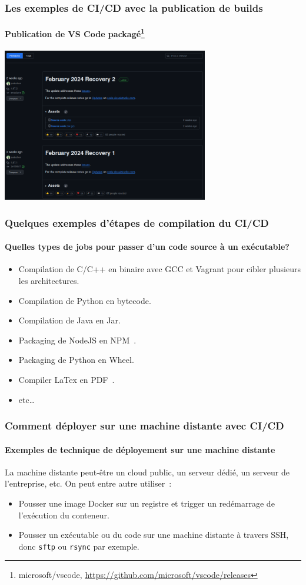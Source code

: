 \documentclass{beamer}
\begin{document}
    \begin{frame}
        \frametitle{Les exemples de CI/CD avec la publication de builds}
        \framesubtitle{Publication de VS Code packagé\footnote{microsoft/vscode, \url{https://github.com/microsoft/vscode/releases}}}
        \transdissolve
        \centering
        \includegraphics[width=9cm]{image/vs-code-release.png}
    \end{frame}

    \begin{frame}
        \frametitle{Quelques exemples d'étapes de compilation du CI/CD}
        \framesubtitle{Quelles types de jobs pour passer d'un code source à un exécutable?}
        \transdissolve
        \pause
        \begin{itemize}
            \item Compilation de C/C++ en binaire avec GCC et Vagrant pour cibler plusieurs les architectures.
            \item Compilation de Python en bytecode.
            \item Compilation de Java en Jar.
            \item Packaging de NodeJS en NPM~.
            \item Packaging de Python en Wheel.
            \item Compiler LaTex en PDF~.
            \item etc\ldots
        \end{itemize}
    \end{frame}

    \begin{frame}
        \frametitle{Comment déployer sur une machine distante avec CI/CD}
        \framesubtitle{Exemples de technique de déployement sur une machine distante}
        \transdissolve
        La machine distante peut-être un cloud public, un serveur dédié, un serveur de l'entreprise, etc.
        \bigbreak
        On peut entre autre utiliser~:
        \begin{itemize}
            \item Pousser une image Docker sur un registre et trigger un redémarrage de l'exécution du conteneur.
            \item Pousser un exécutable ou du code sur une machine distante à travers SSH, donc \lstinline{sftp} ou \lstinline{rsync} par exemple.
        \end{itemize}
    \end{frame}
\end{document}
